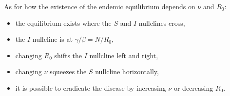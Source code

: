 \documentclass[a4paper,12pt]{article}
\begin{document}
\begin{enumerate}[label={\bf \arabic{*}.\;}, ref={\arabic{*}},itemsep=3ex, left=0ex]
{\begin{enumerate}
    As for how the existence of the endemic equilibrium depends on $\nu$ and $R_0$:
    \begin{itemize}
        \item the equilibrium exists where the $S$ and $I$ nullclines cross,
        \item the $I$ nullcline is at $\gamma/\beta = N/R_0$,
        \item changing $R_0$ shifts the $I$ nullcline left and right,
        \item changing $\nu$ squeezes the $S$ nullcline horizontally,
        \item it is possible to eradicate the disease by increasing $\nu$ or decreasing $R_0$.
    \end{itemize}
    
\end{enumerate}
}


\end{enumerate}
\end{document}
